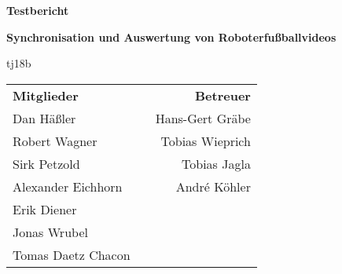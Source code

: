\begin{titlepage}
\begin{center}
{\Huge\textbf{Testbericht}\vspace{2em}}

{\Large\textbf{Synchronisation und Auswertung von Roboterfußballvideos}\vspace{1em}}

{\textsf{tj18b}\vspace{2em}}

\begin{table}[b]
\begin{tabularx}{\textwidth}{lXr}
\textbf{Mitglieder}&&\textbf{Betreuer}\\
Dan Häßler&&Hans-Gert Gräbe\\
Robert Wagner&&Tobias Wieprich\\
Sirk Petzold&&Tobias Jagla\\
Alexander Eichhorn&&André Köhler\\
Erik Diener&&\\
Jonas Wrubel&&\\
Tomas Daetz Chacon&&\\
\end{tabularx}
\end{table}
\end{center}
\end{titlepage}